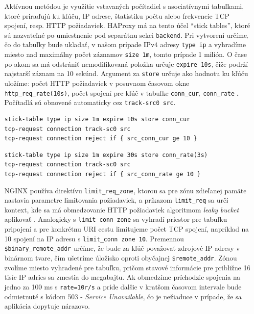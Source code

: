 \documentclass[12pt, a4paper]{article}
\begin{document}
Aktívnou metódou je využitie vstavaných počítadiel s asociatívnymi tabuľkami, ktoré priraďujú ku kľúču,
IP adrese, štatistiku počtu alebo frekvencie TCP spojení, resp. HTTP požiadaviek. HAProxy má na tento
účel \enquote{stick tables}, ktoré sú nazvateľné po umiestnenie pod separátnu sekci \verb|backend|. Pri
vytvorení určíme, čo do tabuľky bude ukladať, v našom prípade IPv4 adresy \verb|type ip| a vyhradíme miesto
nad maximálny počet záznamov \verb|size 1m|, tomto prípade 1 milión. O čase po akom sa má odstrániť 
nemodifikovaná položka určuje \verb|expire 10s|, čiže podrží najstarší záznam na 10 sekúnd. Argument za
\verb|store| určuje ako hodnotu ku kľúču uložíme: počet HTTP požiadaviek v posuvnom časovom okne 
\verb|http_req_rate(10s)|, počet spojení pre kľúč v tabuľke \verb|conn_cur|, \verb|conn_rate| 
\cite{haproxy-stick-tables}. Počítadlá sú obnovené automaticky cez \verb|track-src0 src|.

\begin{lstlisting}[caption=HAProxy: obmedzenie počtu otvorených spojení na IP adresu na 10 zároveň]
stick-table type ip size 1m expire 10s store conn_cur
tcp-request connection track-sc0 src
tcp-request connection reject if { src_conn_cur ge 10 }
\end{lstlisting}

\begin{lstlisting}[caption=HAProxy: obmedzenie frekvencie pripojení na používateľa]
stick-table type ip size 1m expire 30s store conn_rate(3s)
tcp-request connection track-sc0 src
tcp-request connection reject if { src_conn_rate ge 10 }
\end{lstlisting}

NGINX používa direktívu \verb|limit_req_zone|, ktorou sa pre zónu zdieľanej pamäte nastavia parametre
limitovania požiadaviek, a príkazom \verb|limit_req| sa určí kontext, kde sa má obmedzovanie HTTP požiadaviek 
algoritmom \emph{leaky bucket} aplikovať \cite{nginx-rate-limiting}. Analogicky s \verb|limit_conn_zone| sa 
vyhradí priestor pre tabuľku pripojení a pre konkrétnu URI cestu limitujeme počet TCP spojení, napríklad na 
10 spojení na IP adresu s \verb|limit_conn zone 10|. Premennou \verb|$binary_remote_addr| určíme, že bude za 
kľúč považovať zdrojové IP adresy v binárnom tvare, čím ušetríme úložisko oproti obyčajnej
\verb|$remote_addr|. Zónou zvolíme miesto vyhradené pre tabuľku, pričom stavové informácie pre približne 16 
tisíc IP adries sa zmestia do megabajtu. Ak obmedzíme príchodzie spojenia na jedno za 100 ms s 
\verb|rate=10r/s| a príde ďalšie v kratšom časovom intervale bude odmietnuté s kódom 503 - 
\emph{Service Unavailable}, čo je nežiaduce v prípade, že sa aplikácia dopytuje nárazovo. 
\end{document}

